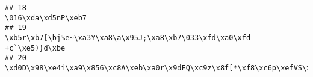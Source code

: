 \documentclass[
]{article}
\begin{document}
\begin{verbatim}
## 18                                                                                                                                                                                                                                                                                                                                                                                                                                                                                                                                                                                                                                                                                                                                                                                                                                                                                        \016\xda\xd5nP\xeb7
## 19                                                                                                                                                                                                                                                                                                                                                                                                                                                                                                                                                                                                                                                                                                                                                                                                                                   \xb5r\xb7[\bj%e~\xa3Y\xa8\a\x95J;\xa8\xb7\033\xfd\xa0\xfd +c`\xe5)}d\xbe
## 20                                                                                                                                                                                                                                                                                                                                                                                                                                                                                                                                                                                                                                                                                                                      \xd0D\x98\xe4i\xa9\x856\xc8A\xeb\xa0r\x9dFQ\xc9z\x8f[*\xf8\xc6p\xefVS\xc9űW\xc7^\xd1u{\xf0\x93\034j\xef\x95\xc4\xf3\xe8ٜ\xe3̼\xe5\xed\xa0\035\xb6\005p.\xc4(\xd5^\x91\xa7\xf0&\0343\xaa

\end{verbatim}
\end{document}

